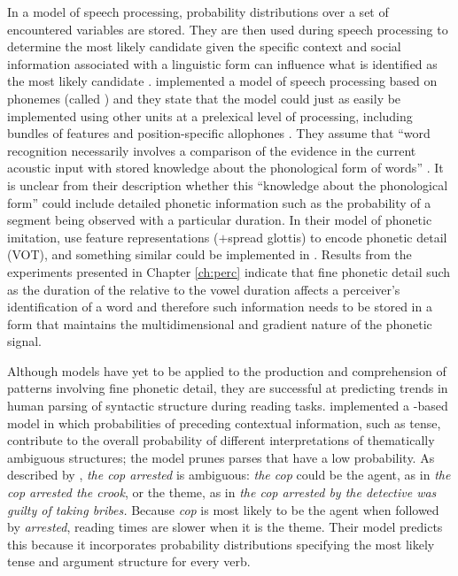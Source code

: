 In a  model of speech processing, probability distributions over a set of encountered variables are stored.  They are then used during speech processing to determine the most likely candidate given the specific context \citep{norrismcqueen2008} and social information associated with a linguistic form can influence what is identified as the most likely candidate \citep{staumcasasanto2009}.  \citet{norrismcqueen2008} implemented a  model of speech processing based on phonemes (called ) and they state that the model could just as easily be implemented using other units at a prelexical level of processing, including bundles of features and position-specific allophones \citep[362]{norrismcqueen2008}.  They assume that ``word recognition necessarily involves a comparison of the evidence in the current acoustic input with stored knowledge about the phonological form of words'' \citep[379]{norrismcqueen2008}. It is unclear from their description whether this ``knowledge about the phonological form'' could include detailed phonetic information such as the probability of a segment being observed with a particular duration.  In their  model of phonetic imitation, \citet{nielsenwilson2008} use feature representations ($+$spread glottis) to encode phonetic detail (VOT), and something similar could be implemented in . Results from the  experiments presented in Chapter \ref{ch:perc} indicate that fine phonetic detail such as the duration of the  relative to the vowel duration affects a perceiver's identification of a word and therefore such information needs to be stored in a form that maintains the multidimensional and gradient nature of the phonetic signal.

Although  models have yet to be applied to the production and comprehension of patterns involving fine phonetic detail, they are successful at predicting trends in human parsing of syntactic structure during reading tasks.   \citet{narayananjurafsky1998,narayananjurafsky2002} implemented a -based model in which probabilities of preceding contextual information, such as tense, contribute to the overall probabi\-lity of different interpretations of thematically ambiguous structures; the model prunes parses that have a low probability.  As described by \citet[59]{narayananjurafsky2002}, \textit{the cop arrested} is ambiguous: \textit{the cop} could be the agent, as in \textit{the cop arrested the crook}, or the theme, as in \textit{the cop arrested by the detective was guilty of taking bribes.}  Because \textit{cop} is most likely to be the agent when followed by \textit{arrested}, reading times are slower when it is the theme. Their model predicts this because it incorporates probability distributions specifying the most likely tense and argument structure for every verb. 
  
